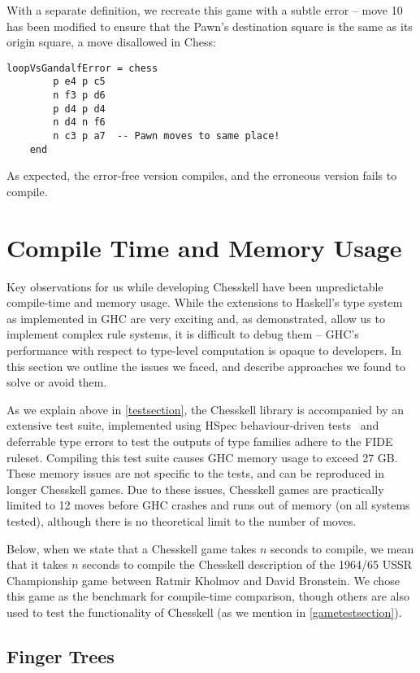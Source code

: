 With a separate definition, we recreate this game with a subtle error -- move 10 has been modified to ensure that the Pawn's destination square is the same as its origin square, a move disallowed in Chess:

\begin{lstlisting}
loopVsGandalfError = chess
        p e4 p c5
        n f3 p d6
        p d4 p d4
        n d4 n f6
        n c3 p a7  -- Pawn moves to same place!
    end
\end{lstlisting}

As expected, the error-free version compiles, and the erroneous version fails to compile.

\section{Compile Time and Memory Usage} \label{problemsection}

Key observations for us while developing Chesskell have been unpredictable compile-time and memory usage. While the extensions to Haskell's type system as implemented in GHC are very exciting and, as demonstrated, allow us to implement complex rule systems, it is difficult to debug them -- GHC's performance with respect to type-level computation is opaque to developers. In this section we outline the issues we faced, and describe approaches we found to solve or avoid them.

As we explain above in \cref{testsection}, the Chesskell library is accompanied by an extensive test suite, implemented using HSpec behaviour-driven tests~\cite{hspec} and deferrable type errors to test the outputs of type families adhere to the FIDE ruleset. Compiling this test suite causes GHC memory usage to exceed 27 GB. These memory issues are not specific to the tests, and can be reproduced in longer Chesskell games. Due to these issues, Chesskell games are practically limited to 12 moves before GHC crashes and runs out of memory (on all systems tested), although there is no theoretical limit to the number of moves.

Below, when we state that a Chesskell game takes $n$ seconds to compile, we mean that it takes $n$ seconds to compile the Chesskell description of the 1964/65 USSR Championship game between Ratmir Kholmov and David Bronstein. We chose this game as the benchmark for compile-time comparison, though others are also used to test the functionality of Chesskell (as we mention in \cref{gametestsection}).

\subsection{Finger Trees} \label{fingertreesection}

